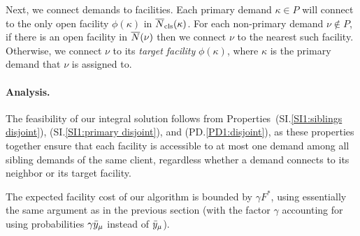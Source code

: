 Next, we connect demands to facilities.
Each primary demand $\kappa\in P$ will connect
to the only open facility $\phi(\kappa)$ in ${\overline{N}}_{\text{cls}}(\kappa)$.  
For each non-primary demand $\nu\notin P$, if
there is an open facility in ${\overline{N}}(\nu)$ then we connect
$\nu$ to the nearest such facility. Otherwise, we connect
$\nu$ to its \emph{target facility} $\phi(\kappa)$, where $\kappa$ is the primary
demand that $\nu$ is assigned to. 


\paragraph{Analysis.}
The feasibility of our integral solution follows from
Properties~(SI.\ref{SI1:siblings disjoint}), (SI.\ref{SI1:primary
  disjoint}), and (PD.\ref{PD1:disjoint}), as these properties together
ensure that each facility is accessible to at most one demand among
all sibling demands of the same client, regardless whether a demand
connects to its neighbor or its target facility.

The expected facility cost of our algorithm is bounded by
$\gamma F^\ast$, using essentially the same argument as in
the previous section (with the factor $\gamma$
accounting for using probabilities $\gamma {\bar y}_{\mu}$
instead of ${\bar y}_{\mu}$).

